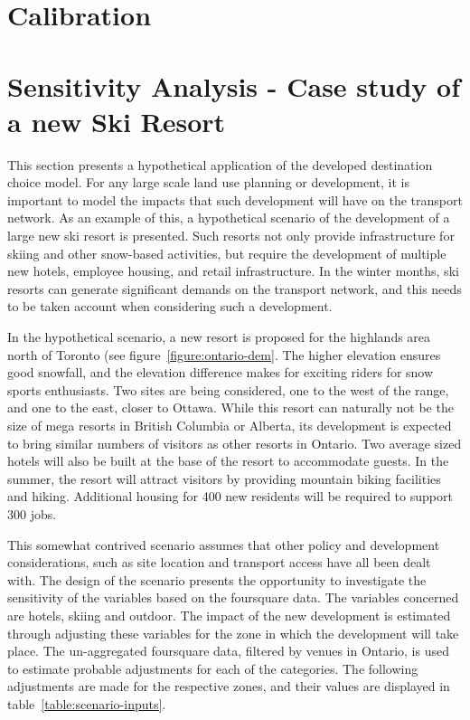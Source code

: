 \section{Calibration}

\section{Sensitivity Analysis - Case study of a new Ski Resort}




This section presents a hypothetical application of the developed destination choice model. For any large scale land use planning or development, it is important to model the impacts that such development will have on the transport network. As an example of this, a hypothetical scenario of the development of a large new ski resort is presented. Such resorts not only provide infrastructure for skiing and other snow-based activities, but require the development of multiple new hotels, employee housing, and retail infrastructure. In the winter months, ski resorts can generate significant demands on the transport network, and this needs to be taken account when considering such a development.

In the hypothetical scenario, a new resort is proposed for the highlands area north of Toronto (see figure~\ref{figure:ontario-dem}. The higher elevation ensures good snowfall, and the elevation difference makes for exciting riders for snow sports enthusiasts. Two sites are being considered, one to the west of the range, and one to the east, closer to Ottawa. While this resort can naturally not be the size of mega resorts in British Columbia or Alberta, its development is expected to bring similar numbers of visitors as other resorts in Ontario. Two average sized hotels will also be built at the base of the resort to accommodate guests. In the summer, the resort will attract visitors by providing mountain biking facilities and hiking. Additional housing for 400 new residents will be required to support 300 jobs.

This somewhat contrived scenario assumes that other policy and development considerations, such as site location and transport access have all been dealt with. The design of the scenario presents the opportunity to investigate the sensitivity of the  variables based on the foursquare data. The variables concerned are hotels, skiing and outdoor. The impact of the new development is estimated through adjusting these variables for the zone in which the development will take place. The un-aggregated foursquare data, filtered by venues in Ontario, is used to estimate probable adjustments for each of the categories. The following adjustments are made for the respective zones, and their values are displayed in table~\ref{table:scenario-inputs}.

